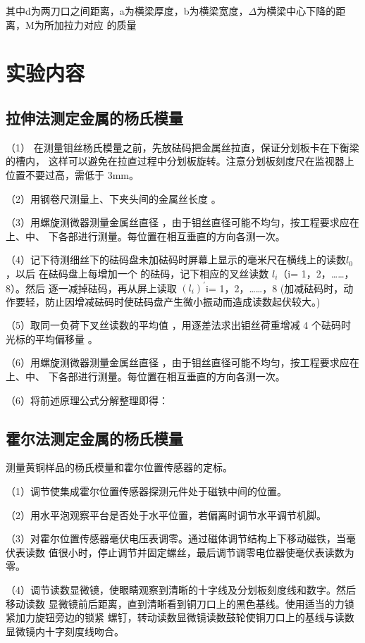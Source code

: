 \documentclass[12pt,a4paper]{article}
\begin{document}
    其中d为两刀口之间距离，a为横梁厚度，b为横梁宽度，$\Delta$为横梁中心下降的距离，M为所加拉力对应
    的质量
    
\section{实验内容}
   \subsection{拉伸法测定金属的杨氏模量}
   （1） 在测量钼丝杨氏模量之前，先放砝码把金属丝拉直，保证分划板卡在下衡梁的槽内，
这样可以避免在拉直过程中分划板旋转。注意分划板刻度尺在监视器上位置不要过高，需低于
3mm。

（2）用钢卷尺测量上、下夹头间的金属丝长度 。

（3）用螺旋测微器测量金属丝直径 ，由于钼丝直径可能不均匀，按工程要求应在上、中、
下各部进行测量。每位置在相互垂直的方向各测一次。

（4）记下待测细丝下的砝码盘未加砝码时屏幕上显示的毫米尺在横线上的读数$l_0$，以后
在砝码盘上每增加一个 的砝码，记下相应的叉丝读数 $l_i$（i= 1，2，……，8）。然后
逐一减掉砝码，再从屏上读取 $(l_i)^'$i= 1，2，……，8
(加减砝码时，动作要轻，防止因增减砝码时使砝码盘产生微小振动而造成读数起伏较大。)

（5）取同一负荷下叉丝读数的平均值 ，用逐差法求出钼丝荷重增减 4 个砝码时
光标的平均偏移量 。

（6）用螺旋测微器测量金属丝直径 ，由于钼丝直径可能不均匀，按工程要求应在上、中、
下各部进行测量。每位置在相互垂直的方向各测一次。

（6）将前述原理公式分解整理即得：
\subsection{霍尔法测定金属的杨氏模量}
测量黄铜样品的杨氏模量和霍尔位置传感器的定标。

（1）调节使集成霍尔位置传感器探测元件处于磁铁中间的位置。

（2）用水平泡观察平台是否处于水平位置，若偏离时调节水平调节机脚。

（3）对霍尔位置传感器毫伏电压表调零。通过磁体调节结构上下移动磁铁，当毫伏表读数
值很小时，停止调节并固定螺丝，最后调节调零电位器使毫伏表读数为零。

（4）调节读数显微镜，使眼睛观察到清晰的十字线及分划板刻度线和数字。然后移动读数
显微镜前后距离，直到清晰看到铜刀口上的黑色基线。使用适当的力锁紧加力旋钮旁边的锁紧
螺钉，转动读数显微镜读数鼓轮使铜刀口上的基线与读数显微镜内十字刻度线吻合。
\end{document}
